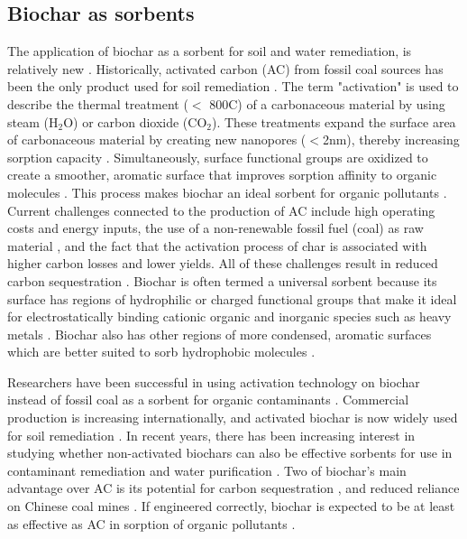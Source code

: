 \subsection{Biochar as sorbents}
The application of biochar as a sorbent for soil and water remediation, is relatively new \citep{beesley2011review}. Historically, activated carbon (\acrshort{AC}) from fossil coal sources has been the only product used for soil remediation \citep{hagemann2018activated}. The term "activation" is used to describe the thermal treatment ($<$ 800\textdegree C) of a carbonaceous material by using steam ($\mathrm{H_2O}$) or carbon dioxide ($\mathrm{CO_2}$). These treatments expand the surface area of carbonaceous material by creating new nanopores ($<$2nm), thereby increasing sorption capacity \citep{LehmannAndJoseph2015}. Simultaneously, surface functional groups are oxidized to create a smoother, aromatic surface that improves sorption affinity to organic molecules \citep{sajjadi2019comprehensive}. This process makes biochar an ideal sorbent for organic pollutants \citep{Ahmad2014}. Current challenges connected to the production of AC include high operating costs and energy inputs, the use of a non-renewable fossil fuel (coal) as raw material \citep{Li2019}, and the fact that the activation process of char is associated with higher carbon losses and lower yields. All of these challenges result in reduced carbon sequestration \citep{Sormo2021}. Biochar is often termed a universal sorbent because its surface has  regions of hydrophilic or charged functional groups that make it ideal for electrostatically binding cationic organic and inorganic species such as heavy metals \citep{silvani2019can,zhang2013sorption}. Biochar also has other regions of more condensed, aromatic surfaces which are better suited to sorb hydrophobic molecules \citep{Cornelissen2005}.

Researchers have been successful in using activation technology on biochar instead of fossil coal as a sorbent for organic contaminants \citep{Sormo2021}. Commercial production is increasing internationally, and activated biochar is now widely used for soil remediation \citep{hagemann2018activated}. In recent years, there has been increasing interest in studying whether non-activated biochars can also be effective sorbents for use in contaminant remediation and water purification \citep{hagemann2018activated}. Two of biochar's main advantage over AC is its potential for carbon sequestration \citep{smith2016soil}, and reduced reliance on Chinese coal mines \citep{zheng2019influence}. If engineered correctly, biochar is expected to be at least as effective as AC in sorption of organic pollutants \citep{Sormo2021}. 


